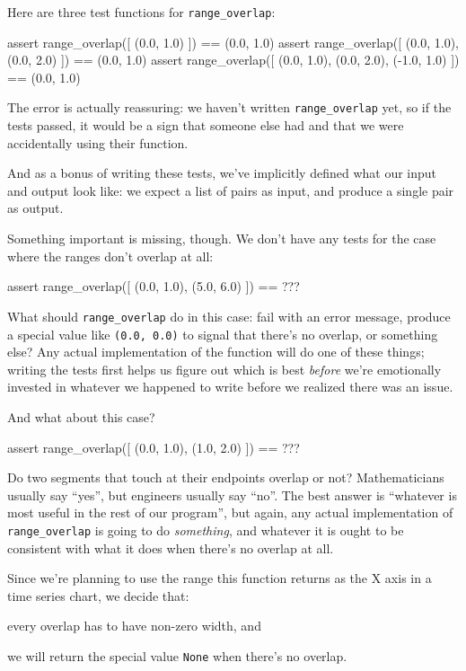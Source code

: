 Here are three test functions for \texttt{range\_overlap}:

\begin{VerbIn}
assert range_overlap([ (0.0, 1.0) ]) == (0.0, 1.0)
assert range_overlap([ (0.0, 1.0), (0.0, 2.0) ]) == (0.0, 1.0)
assert range_overlap([ (0.0, 1.0), (0.0, 2.0), (-1.0, 1.0) ]) == (0.0, 1.0)
\end{VerbIn}

The error is actually reassuring: we haven't written
\texttt{range\_overlap} yet, so if the tests passed, it would be a sign
that someone else had and that we were accidentally using their
function.

And as a bonus of writing these tests, we've implicitly defined what our
input and output look like: we expect a list of pairs as input, and
produce a single pair as output.

Something important is missing, though. We don't have any tests for the
case where the ranges don't overlap at all:

\begin{VerbIn}
assert range_overlap([ (0.0, 1.0), (5.0, 6.0) ]) == ???
\end{VerbIn}

What should \texttt{range\_overlap} do in this case: fail with an error
message, produce a special value like \texttt{(0.0, 0.0)} to signal that
there's no overlap, or something else? Any actual implementation of the
function will do one of these things; writing the tests first helps us
figure out which is best \emph{before} we're emotionally invested in
whatever we happened to write before we realized there was an issue.

And what about this case?

\begin{VerbIn}
assert range_overlap([ (0.0, 1.0), (1.0, 2.0) ]) == ???
\end{VerbIn}

Do two segments that touch at their endpoints overlap or not?
Mathematicians usually say ``yes'', but engineers usually say ``no''.
The best answer is ``whatever is most useful in the rest of our
program'', but again, any actual implementation of
\texttt{range\_overlap} is going to do \emph{something}, and whatever it
is ought to be consistent with what it does when there's no overlap at
all.

Since we're planning to use the range this function returns as the X
axis in a time series chart, we decide that:

\begin{swcenumerate}
\item
  every overlap has to have non-zero width, and
\item
  we will return the special value \texttt{None} when there's no
  overlap.
\end{swcenumerate}

